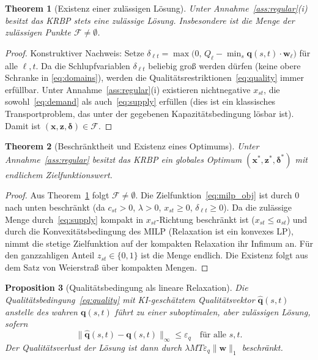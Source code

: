 ﻿\documentclass[12pt,a4paper]{article}
\theoremstyle{plain}
\newtheorem{theorem}{Theorem}[section]
\newtheorem{proposition}[theorem]{Proposition}
\theoremstyle{definition}
\begin{document}
	\begin{theorem}[Existenz einer zulässigen Lösung]
		\label{thm:feasible}
		Unter Annahme~\ref{ass:regular}(i) besitzt das KRBP stets eine zulässige
		Lösung. Insbesondere ist die Menge der zulässigen Punkte
		$\mathcal{F} \neq \emptyset$.
	\end{theorem}
	
	\begin{proof}
		Konstruktiver Nachweis: Setze $\delta_{\ell t} = \max\bigl(0,\,
		Q_\ell - \min_s \mathbf{q}(s,t)\cdot\mathbf{w}_\ell\bigr)$ für alle
		$\ell, t$. Da die Schlupfvariablen $\delta_{\ell t}$ beliebig groß
		werden dürfen (keine obere Schranke in \eqref{eq:domains}), werden
		die Qualitätsrestriktionen~\eqref{eq:quality} immer erfüllbar.
		Unter Annahme~\ref{ass:regular}(i) existieren nichtnegative $x_{st}$,
		die sowohl~\eqref{eq:demand} als auch~\eqref{eq:supply} erfüllen
		(dies ist ein klassisches Transportproblem, das unter der gegebenen
		Kapazitätsbedingung lösbar ist). Damit ist $(\mathbf{x},\mathbf{z},
		\boldsymbol{\delta}) \in \mathcal{F}$.
	\end{proof}
	
	\begin{theorem}[Beschränktheit und Existenz eines Optimums]
		\label{thm:bounded}
		Unter Annahme~\ref{ass:regular} besitzt das KRBP ein globales Optimum
		$(\mathbf{x}^*, \mathbf{z}^*, \boldsymbol{\delta}^*)$ mit endlichem
		Zielfunktionswert.
	\end{theorem}
	
	\begin{proof}
		Aus Theorem~\ref{thm:feasible} folgt $\mathcal{F} \neq \emptyset$.
		Die Zielfunktion~\eqref{eq:milp_obj} ist durch 0 nach unten beschränkt
		(da $c_{st} > 0$, $\lambda > 0$, $x_{st} \geq 0$, $\delta_{\ell t}
		\geq 0$). Da die zulässige Menge durch~\eqref{eq:supply} kompakt in
		$x_{st}$-Richtung beschränkt ist ($x_{st} \leq a_{st}$) und durch die
		Konvexitätsbedingung des MILP (Relaxation ist ein konvexes LP), nimmt
		die stetige Zielfunktion auf der kompakten Relaxation ihr Infimum an.
		Für den ganzzahligen Anteil $z_{st} \in \{0,1\}$ ist die Menge endlich.
		Die Existenz folgt aus dem Satz von Weierstraß über kompakten Mengen.
	\end{proof}
	
	\begin{proposition}[Qualitätsbedingung als lineare Relaxation]
		Die Qualitätsbedingung~\eqref{eq:quality} mit KI-geschätztem
		Qualitätsvektor $\hat{\mathbf{q}}(s,t)$ anstelle des wahren
		$\mathbf{q}(s,t)$ führt zu einer suboptimalen, aber zulässigen Lösung,
		sofern
		\[
		\bigl\|\hat{\mathbf{q}}(s,t) - \mathbf{q}(s,t)\bigr\|_\infty
		\leq \varepsilon_q \quad\text{für alle } s, t.
		\]
		Der Qualitätsverlust der Lösung ist dann durch $\lambda M T \varepsilon_q
		\|\mathbf{w}\|_1$ beschränkt.
	\end{proposition}
	
\end{document}
